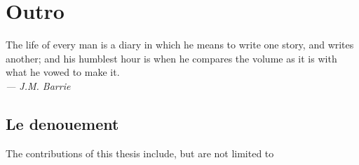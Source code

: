 
  \chapter{Outro}
  \label{chp:outro}

  \begin{flushright}
    \begin{minipage}[]{0.55\linewidth}
      \begin{flushright}
        The life of every man is a diary in which he means to write
        one story, and writes another; and his humblest hour is when
        he compares the volume as it is with what he vowed to make
        it. \\{\small \emph{--- J.M. Barrie} }
      \end{flushright}
    \end{minipage}
  \end{flushright}
  \vspace{\baselineskip}

  \section{Le denouement}

  The contributions of this thesis include, but are not limited to

